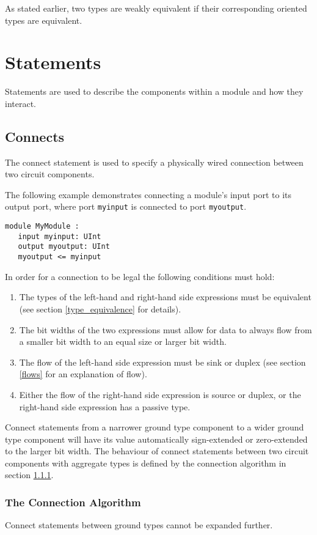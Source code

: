 \documentclass[12pt]{article}
\begin{document}
As stated earlier, two types are weakly equivalent if their corresponding oriented types are equivalent.


\section{Statements} \label{statements}

Statements are used to describe the components within a module and how they interact.

\subsection{Connects}\label{connects}
The connect statement is used to specify a physically wired connection between two circuit components.

The following example demonstrates connecting a module's input port to its output port, where port \verb|myinput| is connected to port \verb|myoutput|.
\begin{lstlisting}
module MyModule :
   input myinput: UInt
   output myoutput: UInt
   myoutput <= myinput
\end{lstlisting}

In order for a connection to be legal the following conditions must hold:
\begin{enumerate}
\item The types of the left-hand and right-hand side expressions must be equivalent (see section \ref{type_equivalence} for details).
\item The bit widths of the two expressions must allow for data to always flow from a smaller bit width to an equal size or larger bit width.
\item The flow of the left-hand side expression must be sink or duplex (see section \ref{flows} for an explanation of flow).
\item Either the flow of the right-hand side expression is source or duplex, or the right-hand side expression has a passive type.
\end{enumerate}

Connect statements from a narrower ground type component to a wider ground type component will have its value automatically sign-extended or zero-extended to the larger bit width. The behaviour of connect statements between two circuit components with aggregate types is defined by the connection algorithm in section \ref{connection_algorithm}.

\subsubsection{The Connection Algorithm} \label{connection_algorithm}
Connect statements between ground types cannot be expanded further.
\end{document}
